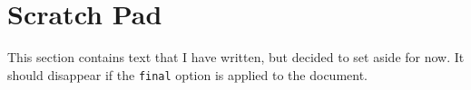 \section*{Scratch Pad}

This section contains text that I have written, but decided to set aside for now.
It should disappear if the \lstinline{final} option is applied to the document.
